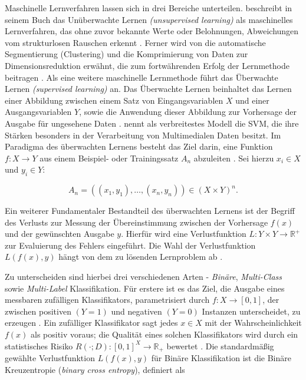 Maschinelle Lernverfahren lassen sich in drei Bereiche unterteilen. \citeauthor{Sejnowski1999} beschreibt in seinem Buch  das Unüberwachte Lernen \emph{(unsupervised learning)} als maschinelles Lernverfahren, das ohne zuvor bekannte Werte oder Belohnungen, Abweichungen vom strukturlosen Rauschen erkennt \cite{Sejnowski1999}. Ferner wird von \citeauthor{duda1973pattern} die automatische Segmentierung (Clustering) und die Komprimierung von Daten zur Dimensionsreduktion erwähnt, die zum fortwährenden Erfolg der Lernmethode beitragen \cites[51\psq]{duda1973pattern}[51\psq]{Cord2008}. Als eine weitere maschinelle Lernmethode führt \citeauthor{Cord2008} das Überwachte Lernen \emph{(supervised learning)} an. Das Überwachte Lernen beinhaltet das Lernen einer Abbildung zwischen einem Satz von Eingangsvariablen $X$ und einer Ausgangsvariablen $Y$, sowie die Anwendung dieser Abbildung zur Vorhersage der Ausgabe für ungesehene Daten \cite[21\psqq]{Cord2008}. \citeauthor{Cord2008} nennt \citeyear{Cord2008} als verbreitestes Modell die \ac{SVM}, die ihre Stärken besonders in der Verarbeitung von Multimedialen Daten besitzt. Im Paradigma des überwachten Lernens besteht das Ziel darin, eine Funktion $f:X \longrightarrow Y$ aus einem Beispiel- oder Trainingssatz $A_{n}$ abzuleiten \cite[22]{Cord2008}. Sei hierzu $x_i \in X$ und $y_i \in Y$:

\begin{equation}
	A_{n} = ((x_{1},y_{1}),\dots,(x_{n},y_{n})) \in (X \times Y)^{n}.
\end{equation}

Ein weiterer Fundamentaler Bestandteil des überwachten Lernens ist der Begriff des Verlusts zur Messung der Übereinstimmung zwischen der Vorhersage $f(x)$ und der gewünschten Ausgabe $y$. Hierfür wird eine Verlustfunktion $L:Y \times Y \longrightarrow \mathbb{R}^+$ zur Evaluierung des Fehlers eingeführt. Die Wahl der Verlustfunktion $L(f(x),y)$ hängt von dem zu lösenden Lernproblem ab \cite[22]{Cord2008}. 

Zu unterscheiden sind hierbei drei verschiedenen Arten - \emph{Binäre}, \emph{Multi-Class} sowie \emph{Multi-Label} Klassifikation. Für erstere ist es das Ziel, die Ausgabe eines messbaren zufälligen Klassifikators, parametrisiert durch $f:X\rightarrow [0,1]$, der zwischen positiven $(Y=1)$ und negativen $(Y=0)$ Instanzen unterscheidet, zu erzeugen \cite[2\psq]{pmlr-v81-menon18a}. Ein zufälliger Klassifikator sagt jedes $x \in X$ mit der Wahrscheinlichkeit $f(x)$ als positiv voraus; die Qualität eines solchen Klassifikators wird durch ein statistisches Risiko $R(\cdot;D): [0,1]^X \rightarrow \mathbb{R}_{+} $ bewertet \cite[3]{pmlr-v81-menon18a}. Die standardmäßig gewählte Verlustfunktion $L(f(x),y)$ für Binäre Klassifikation ist die Binäre Kreuzentropie (\emph{binary cross entropy}), definiert als

